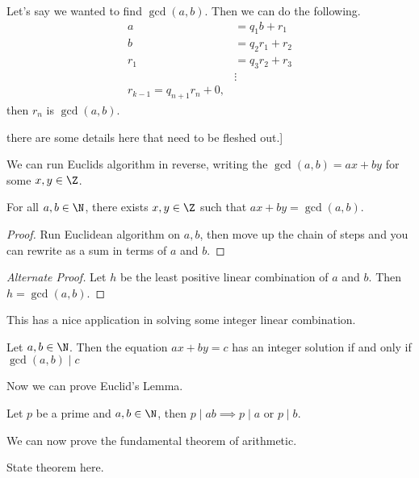 \documentclass[a4]{scrartcl}
\begin{document}
\begin{example}
	Let's say we wanted to find $\gcd(a, b)$. Then we can do the following.
	\begin{align*}
		a &= q_1 b + r_1 \\
		b &= q_2 r_1 + r_2 \\
		r_1 &= q_3 r_2 + r_3 \\
			&\vdots\\
		r_{k - 1} = q_{n + 1} r_n + 0,
	\end{align*}
	then $r_n$ is $\gcd(a, b)$.
\end{example}


{\color{red} there are some details here that need to be fleshed out}.]

We can run Euclids algorithm in reverse, writing the $\gcd(a, b) = ax + by$ for some $x, y \in \Z$. 

\begin{theorem}
	For all $a, b \in \N$, there exists $x, y \in \Z$ such that $ax + by = \gcd(a, b)$. 
\end{theorem}
\begin{proof}
	Run Euclidean algorithm on $a, b$, then move up the chain of steps and you can rewrite as a sum in terms of $a$ and $b$.
\end{proof}
\begin{proof}[Alternate Proof]
	Let $h$ be the least positive linear combination of $a$ and $b$. Then $h = \gcd(a, b)$. 
\end{proof}

This has a nice application in solving some integer linear combination. 

\begin{corollary}
	Let $a, b \in \N$. Then the equation $ax + by = c$ has an integer solution if and only if $\gcd(a, b) 
	\mid c$
\end{corollary}

Now we can prove Euclid's Lemma.

\begin{theorem}
	Let $p$ be a prime and $a, b \in \N$, then $p \mid ab \implies p \mid a$ or $p \mid b$.
\end{theorem}

We can now prove the fundamental theorem of arithmetic.

\begin{theorem}
	State theorem here.
\end{theorem}
\end{document}
